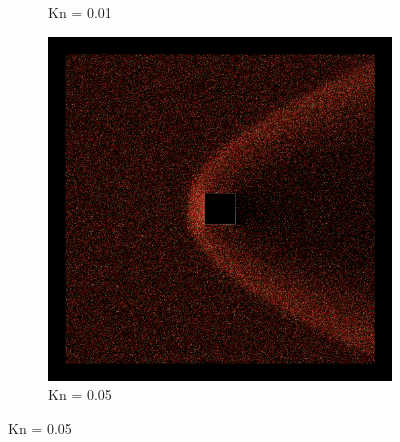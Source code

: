 \begin{figure}
\begin{subfigure}{0.32\textwidth}
        \caption{Kn = 0.01}
    \end{subfigure}
    \hfill
    \begin{subfigure}{0.32\textwidth}
        \centering
        \includegraphics[width=\textwidth]{Images/4. Results/Square Kn/particles/Kn0.05.png}
        \caption{Kn = 0.05}
    \end{subfigure}
    
    \vspace{5pt}
    

\end{figure}

